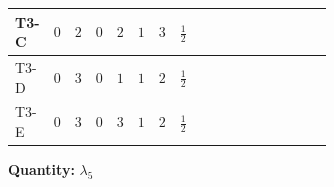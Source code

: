\documentclass[8pt]{article}
\begin{document}
\begin{landscape}
\begin{longtable}{@{}llcccccc >{\raggedright\arraybackslash}p{0.21\linewidth} >{\raggedright\arraybackslash}p{0.21\linewidth} >{\raggedright\arraybackslash}p{0.21\linewidth}@{}}
\midrule
T3-C & $0$ & $2$ & $0$ & $2$ & $1$ & $3$ & $\frac{1}{2}$ & \scriptsize\adjustbox{max width=\linewidth}{$\begin{gathered} +2 {\lambda_{12}^{(1)}} {\lambda_5}\end{gathered}$} & \scriptsize\adjustbox{max width=\linewidth}{$\begin{gathered} +2 {\lambda_1} {\lambda_5}\end{gathered}$} & \scriptsize\adjustbox{max width=\linewidth}{$\begin{gathered} +4 {\lambda_{HS_1}^{(1)}} {\lambda_5}\end{gathered}$} \\
\midrule
T3-D & $0$ & $3$ & $0$ & $1$ & $1$ & $2$ & $\frac{1}{2}$ & \scriptsize\adjustbox{max width=\linewidth}{$\begin{gathered} +2 {\lambda_{12}^{(1)}} {\lambda_5}\end{gathered}$} & \scriptsize\adjustbox{max width=\linewidth}{$\begin{gathered} +2 {\lambda_1} {\lambda_5}\end{gathered}$} & \scriptsize\adjustbox{max width=\linewidth}{$\begin{gathered} +4 {\lambda_{HS_1}^{(1)}} {\lambda_5}\end{gathered}$} \\
\midrule
T3-E & $0$ & $3$ & $0$ & $3$ & $1$ & $2$ & $\frac{1}{2}$ & \scriptsize\adjustbox{max width=\linewidth}{$\begin{gathered} +2 {\lambda_{12}^{(1)}} {\lambda_5}\end{gathered}$} & \scriptsize\adjustbox{max width=\linewidth}{$\begin{gathered} +2 {\lambda_1} {\lambda_5}\end{gathered}$} & \scriptsize\adjustbox{max width=\linewidth}{$\begin{gathered} +4 {\lambda_{HS_1}^{(1)}} {\lambda_5}\end{gathered}$} \\
\midrule
\bottomrule
\end{longtable}
\clearpage
\noindent\textbf{Quantity: }$\lambda_5$\par\smallskip

\end{landscape}
\end{document}
